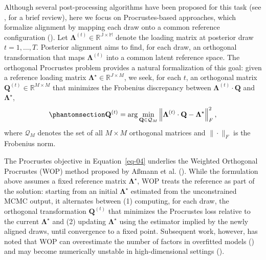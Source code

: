 \documentclass[
  man,
  longtable,
  nolmodern,
  notxfonts,
  notimes,
  colorlinks=true,linkcolor=blue,citecolor=blue,urlcolor=blue]{apa7}
\theoremstyle{plain}
\theoremstyle{plain}
\theoremstyle{remark}
\begin{document}
Although several post-processing algorithms have been proposed for this
task (see , for a
brief review), here we focus on Procrustes-based approaches, which
formalize alignment by mapping each draw onto a common reference
configuration (). Let \(\mathbf\Lambda^{(t)}\in\mathbb{R^{J\times M}}\) denote the
loading matrix at posterior draw \(t=1,\dots,T\). Posterior alignment
aims to find, for each draw, an orthogonal transformation that maps
\(\mathbf\Lambda^{(t)}\) into a common latent reference space. The
orthogonal Procrustes problem provides a natural formalization of this
goal: given a reference loading matrix
\(\mathbf\Lambda^\star\in\mathbb{R}^{J\times M}\), we seek, for each
\(t\), an orthogonal matrix
\(\mathbf{Q}^{(t)}\in\mathbb{R}^{M\times M}\) that minimizes the
Frobenius discrepancy between \(\mathbf{\Lambda}^{(t)}\cdot\mathbf{Q}\)
and \(\mathbf\Lambda^{\star}\),
\begin{equation}\phantomsection\label{eq-04}{
\mathbf{Q}^{(t)} = \arg\min_{\mathbf{Q}\in\mathcal{Q}_M}\left\|\mathbf{\Lambda}^{(t)}\cdot\mathbf{Q} - \mathbf{\Lambda}^\star\right\|^2_F,
}\end{equation} where \(\mathcal{Q}_M\) denotes the set of all
\(M \times M\) orthogonal matrices and \(\|\cdot\|_F\) is the Frobenius
norm.

The Procrustes objective in Equation~\ref{eq-04} underlies the Weighted
Orthogonal Procrustes (WOP) method proposed by Aßmann et al.
(). While the formulation above assumes a
fixed reference matrix \(\mathbf\Lambda^\star\), WOP treats the
reference as part of the solution: starting from an initial
\(\mathbf\Lambda^\star\) estimated from the unconstrained MCMC output,
it alternates between (1) computing, for each draw, the orthogonal
transformation \(\mathbf{Q}^{(t)}\) that minimizes the Procrustes loss
relative to the current \(\mathbf\Lambda^\star\) and (2) updating
\(\mathbf\Lambda^\star\) using the estimator implied by the newly
aligned draws, until convergence to a fixed point. Subsequent work,
however, has noted that WOP can overestimate the number of factors in
overfitted models
() and may become numerically unstable in
high-dimensional settings ().
\end{document}
